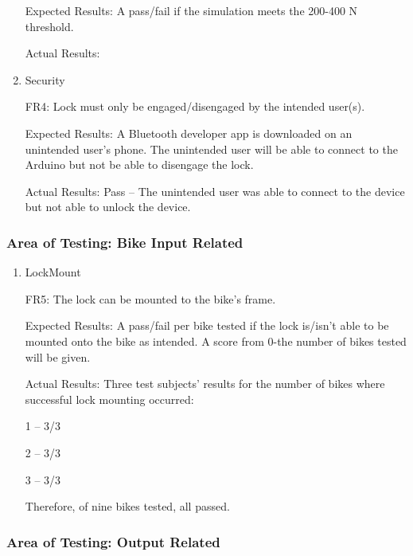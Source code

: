 \documentclass[12pt, titlepage]{article}
\begin{document}
\begin{enumerate}
Expected Results: A pass/fail if the simulation meets the 200-400 N threshold. 

Actual Results:

\item{Security

FR4: Lock must only be engaged/disengaged by the intended user(s). }

Expected Results: A Bluetooth developer app is downloaded on an unintended user’s phone. The unintended user will be able to connect to the Arduino but not be able to disengage the lock. 

Actual Results: Pass -- The unintended user was able to connect to the device but not able to unlock the device. 

\end{enumerate}

\subsubsection{Area of Testing: Bike Input Related}

\begin{enumerate}

\item{LockMount

FR5: The lock can be mounted to the bike’s frame. }

Expected Results: A pass/fail per bike tested if the lock is/isn’t able to be mounted onto the bike as intended. A score from 0-the number of bikes tested will be given.  

Actual Results: Three test subjects’ results for the number of bikes where successful lock mounting occurred: 

1 – 3/3 

2 – 3/3 

3 – 3/3 

Therefore, of nine bikes tested, all passed. 

\end{enumerate}

\subsubsection{Area of Testing: Output Related}
\end{document}
